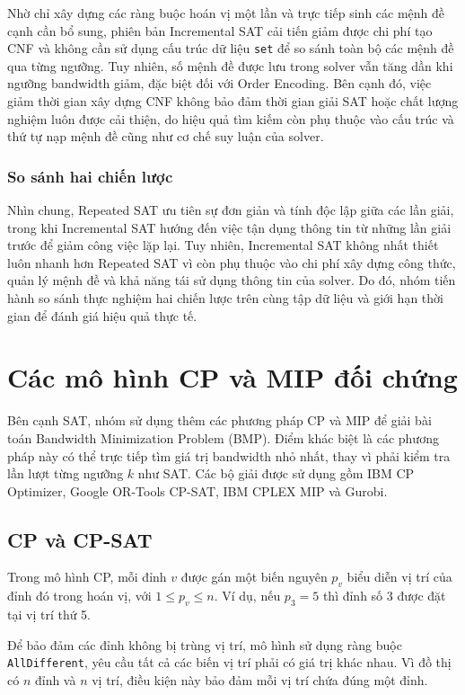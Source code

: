 \documentclass[a4paper,fleqn]{cas-sc}
\newcommand{\code}[1]{\nolinkurl{#1}}
\begin{document}
Nhờ chỉ xây dựng các ràng buộc hoán vị một lần và trực tiếp sinh các mệnh đề cạnh cần bổ sung, phiên bản Incremental SAT cải tiến giảm được chi phí tạo CNF và không cần sử dụng cấu trúc dữ liệu \code{set} để so sánh toàn bộ các mệnh đề qua từng ngưỡng. Tuy nhiên, số mệnh đề được lưu trong solver vẫn tăng dần khi ngưỡng bandwidth giảm, đặc biệt đối với Order Encoding. Bên cạnh đó, việc giảm thời gian xây dựng CNF không bảo đảm thời gian giải SAT hoặc chất lượng nghiệm luôn được cải thiện, do hiệu quả tìm kiếm còn phụ thuộc vào cấu trúc và thứ tự nạp mệnh đề cũng như cơ chế suy luận của solver.


\subsubsection{So sánh hai chiến lược}

Nhìn chung, Repeated SAT ưu tiên sự đơn giản và tính độc lập giữa các lần giải, trong khi Incremental SAT hướng đến việc tận dụng thông tin từ những lần giải trước để giảm công việc lặp lại. Tuy nhiên, Incremental SAT không nhất thiết luôn nhanh hơn Repeated SAT vì còn phụ thuộc vào chi phí xây dựng công thức, quản lý mệnh đề và khả năng tái sử dụng thông tin của solver. Do đó, nhóm tiến hành so sánh thực nghiệm hai chiến lược trên cùng tập dữ liệu và giới hạn thời gian để đánh giá hiệu quả thực tế.



\section{Các mô hình CP và MIP đối chứng}

Bên cạnh SAT, nhóm sử dụng thêm các phương pháp CP và MIP để giải bài toán Bandwidth Minimization Problem (BMP). Điểm khác biệt là các phương pháp này có thể trực tiếp tìm giá trị bandwidth nhỏ nhất, thay vì phải kiểm tra lần lượt từng ngưỡng $k$ như SAT. Các bộ giải được sử dụng gồm IBM CP Optimizer, Google OR-Tools CP-SAT, IBM CPLEX MIP và Gurobi.

\subsection{CP và CP-SAT}

Trong mô hình CP, mỗi đỉnh $v$ được gán một biến nguyên $p_v$ biểu diễn vị trí của đỉnh đó trong hoán vị, với $1\leq p_v\leq n$. Ví dụ, nếu $p_3=5$ thì đỉnh số 3 được đặt tại vị trí thứ 5.

Để bảo đảm các đỉnh không bị trùng vị trí, mô hình sử dụng ràng buộc \code{AllDifferent}, yêu cầu tất cả các biến vị trí phải có giá trị khác nhau. Vì đồ thị có $n$ đỉnh và $n$ vị trí, điều kiện này bảo đảm mỗi vị trí chứa đúng một đỉnh.
\end{document}
